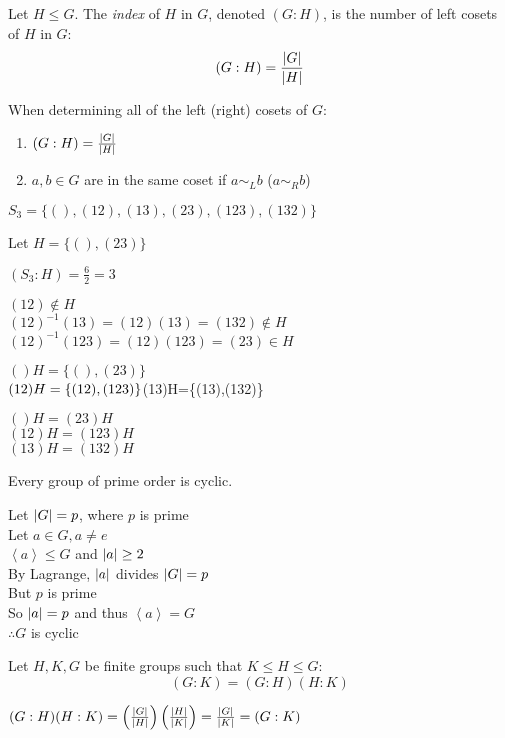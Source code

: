 \documentclass[letterpaper,12pt,fleqn]{article}
\renewcommand{\l}{\sim_L}
\renewcommand{\r}{\sim_R}
\newcommand{\cycle}[1]{\left<#1\right>}
\begin{document}
\begin{definition}
  Let $H\le G$. The \emph{index} of $H$ in $G$, denoted $(G:H)$, is the number
  of left cosets of $H$ in $G$:
  \[(G:H)=\frac{\lvert G\rvert}{\lvert H\rvert}\]
\end{definition}

When determining all of the left (right) cosets of $G$:
\begin{enumerate}
\item $(G:H)=\frac{\lvert G\rvert}{\lvert H\rvert}$
\item $a,b\in G$ are in the same coset if $a\l b$ ($a\r b$)
\end{enumerate}

\begin{example}
  $S_3=\{(),(12),(13),(23),(123),(132)\}$

  Let $H=\{(),(23)\}$

  $(S_3:H)=\frac{6}{2}=3$

  $(12)\notin H$ \\
  $(12)^{-1}(13)=(12)(13)=(132)\notin H$ \\
  $(12)^{-1}(123)=(12)(123)=(23)\in H$

  $()H=\{(),(23)\}$ \\
  $(12)H=\{(12),(123)\} \\
  $(13)H=\{(13),(132)\}

  $()H=(23)H$ \\
  $(12)H=(123)H$ \\
  $(13)H=(132)H$
\end{example}

\begin{theorem}
  Every group of prime order is cyclic.
\end{theorem}

\begin{theproof}
  Let $\lvert G\rvert=p$, where $p$ is prime \\
  Let $a\in G,a\ne e$ \\
  $\cycle{a}\le G$ and $\lvert a\rvert\ge 2$ \\
  By Lagrange, $\lvert a\rvert$ divides $\lvert G\rvert=p$ \\
  But $p$ is prime \\
  So $\lvert a\rvert=p$ and thus $\cycle{a}=G$ \\
  $\therefore G$ is cyclic
\end{theproof}

\begin{theorem}
  Let $H,K,G$ be finite groups such that $K\le H\le G$:
  \[(G:K)=(G:H)(H:K)\]
\end{theorem}

\begin{theproof}
  $(G:H)(H:K)=
  \left(\frac{\lvert G\rvert}{\lvert H\rvert}\right)\left(\frac{\lvert H\rvert}{\lvert K\rvert}\right)=
  \frac{\lvert G\rvert}{\lvert K\rvert}=(G:K)$
\end{theproof}
\end{document}
